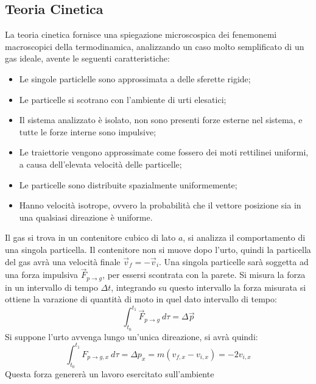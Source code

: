 \documentclass{article}
\numberwithin{equation}{subsection}
\begin{document}
\subsection{Teoria Cinetica}
La teoria cinetica fornisce una spiegazione microscospica 
dei fenemonemi macroscopici della termodinamica, analizzando 
un caso molto semplificato di un gas ideale, avente le seguenti 
caratteristiche:
\begin{itemize}
    \item Le singole particlelle sono approssimata a delle 
    sferette rigide;\\
    \item Le particelle si scotrano con l'ambiente di urti elesatici;\\
    \item Il sistema analizzato è isolato, non sono presenti forze 
    esterne nel sistema, e tutte le forze interne sono impulsive;\\
    \item Le traiettorie vengono approssimate come fossero dei 
    moti rettilinei uniformi, a causa dell'elevata velocità 
    delle particelle;\\
    \item Le particelle sono distribuite spazialmente uniformemente;\\
    \item Hanno velocità isotrope, ovvero la probabilità che 
    il vettore posizione sia in una qualsiasi direazione è uniforme. 
\end{itemize}
Il gas si trova in un contenitore cubico di lato $a$, 
si analizza il comportamento di una singola particella. 
Il contenitore non si muove 
dopo l'urto, quindi la particella del gas avrà una velocità 
finale $\vec v_f=-\vec v_i$.  
Una singola particelle sarà soggetta ad una forza impulsiva 
$\vec{F}_{p\to g}$, 
per essersi scontrata con la parete. Si misura la forza in 
un intervallo di tempo $\Delta t$, integrando su questo intervallo la forza misurata si ottiene 
la varazione di quantità di moto in quel dato intervallo di tempo:
\begin{equation}
    \int_{t_0}^{t_1}\vec{F}_{p\to g}\:d\tau=\Delta\vec{p}
\end{equation}
Si suppone l'urto avvenga lungo un'unica direazione, si avrà 
quindi:
\begin{equation}
    \int_{t_0}^{t_1}F_{p\to g, x}\:d\tau=\Delta p_x=m(v_{f,x}-v_{i,x})=-2v_{i,x}
\end{equation}
Questa forza genererà un lavoro esercitato sull'ambiente 
\end{document}

